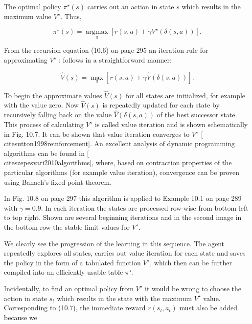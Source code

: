 \documentclass[10pt]{book}
\begin{document}
The optimal policy $\pi^{\star}(s)$ carries out an action in state $s$ which results in the maximum value $V^{\star}$. Thus,



\begin{equation*}
\pi^{\star}(s)=\underset{a}{\operatorname{argmax}}\left[r(s, a)+\gamma V^{\star}(\delta(s, a))\right] . \tag{10.7}
\end{equation*}


From the recursion equation (10.6) on page 295 an iteration rule for approximating $V^{\star}$ : follows in a straightforward manner:


\begin{equation*}
\hat{V}(s)=\max _{a}[r(s, a)+\gamma \hat{V}(\delta(s, a))] . \tag{10.8}
\end{equation*}


To begin the approximate values $\hat{V}(s)$ for all states are initialized, for example with the value zero. Now $\hat{V}(s)$ is repeatedly updated for each state by recursively falling back on the value $\hat{V}(\delta(s, a))$ of the best successor state. This process of calculating $V^{\star}$ is called value iteration and is shown schematically in Fig. 10.7. It can be shown that value iteration converges to $V^{\star}$ [\\cite{sutton1998reinforcement}]. An excellent analysis of dynamic programming algorithms can be found in [\\cite{szepesvari2010algorithms}], where, based on contraction properties of the particular algorithms (for example value iteration), convergence can be proven using Banach's fixed-point theorem.

In Fig. 10.8 on page 297 this algorithm is applied to Example 10.1 on page 289 with $\gamma=0.9$. In each iteration the states are processed row-wise from bottom left to top right. Shown are several beginning iterations and in the second image in the bottom row the stable limit values for $V^{\star}$.

We clearly see the progression of the learning in this sequence. The agent repeatedly explores all states, carries out value iteration for each state and saves the policy in the form of a tabulated function $V^{\star}$, which then can be further compiled into an efficiently usable table $\pi^{\star}$.

Incidentally, to find an optimal policy from $V^{\star}$ it would be wrong to choose the action in state $s_{t}$ which results in the state with the maximum $V^{\star}$ value. Corresponding to (10.7), the immediate reward $r\left(s_{t}, a_{t}\right)$ must also be added because we
\end{document}
